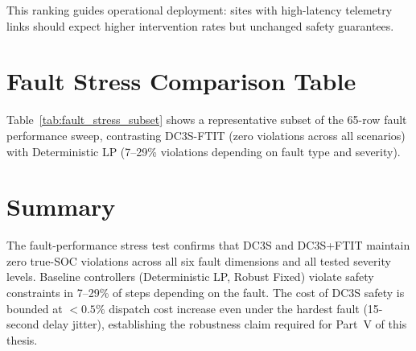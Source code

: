 This ranking guides operational deployment: sites with high-latency
telemetry links should expect higher intervention rates but unchanged
safety guarantees.

\section{Fault Stress Comparison Table}

Table~\ref{tab:fault_stress_subset} shows a representative subset of the
65-row fault performance sweep, contrasting DC3S-FTIT (zero violations
across all scenarios) with Deterministic LP (7--29\% violations depending
on fault type and severity).


\section{Summary}

The fault-performance stress test confirms that DC3S and DC3S+FTIT
maintain zero true-SOC violations across all six fault dimensions and
all tested severity levels.  Baseline controllers (Deterministic LP,
Robust Fixed) violate safety constraints in 7--29\% of steps depending
on the fault.  The cost of DC3S safety is bounded at $<0.5\%$ dispatch
cost increase even under the hardest fault (15-second delay jitter),
establishing the robustness claim required for Part~V of this thesis.

